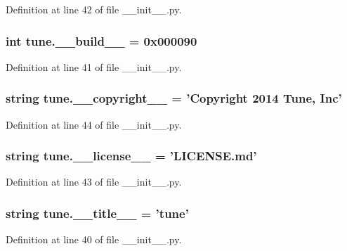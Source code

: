 Definition at line 42 of file \-\_\-\-\_\-init\-\_\-\-\_\-.\-py.

\hypertarget{namespacetune_a6d8e129c5551d67c880bfa5e4deb52ab}{
\subsubsection[{\-\_\-\-\_\-build\-\_\-\-\_\-}]{\setlength{\rightskip}{0pt plus 5cm}int tune.\-\_\-\-\_\-build\-\_\-\-\_\- = 0x000090}}\label{namespacetune_a6d8e129c5551d67c880bfa5e4deb52ab}


Definition at line 41 of file \-\_\-\-\_\-init\-\_\-\-\_\-.\-py.

\hypertarget{namespacetune_a647f6c750f7edd2a15a877ca860f1751}{
\subsubsection[{\-\_\-\-\_\-copyright\-\_\-\-\_\-}]{\setlength{\rightskip}{0pt plus 5cm}string tune.\-\_\-\-\_\-copyright\-\_\-\-\_\- = 'Copyright 2014 Tune, Inc'}}\label{namespacetune_a647f6c750f7edd2a15a877ca860f1751}


Definition at line 44 of file \-\_\-\-\_\-init\-\_\-\-\_\-.\-py.

\hypertarget{namespacetune_a17571a6e3a57f5df06f9a721b48b853f}{
\subsubsection[{\-\_\-\-\_\-license\-\_\-\-\_\-}]{\setlength{\rightskip}{0pt plus 5cm}string tune.\-\_\-\-\_\-license\-\_\-\-\_\- = 'L\-I\-C\-E\-N\-S\-E.\-md'}}\label{namespacetune_a17571a6e3a57f5df06f9a721b48b853f}


Definition at line 43 of file \-\_\-\-\_\-init\-\_\-\-\_\-.\-py.

\hypertarget{namespacetune_aebd95de7f1e0713438deabad8213f921}{
\subsubsection[{\-\_\-\-\_\-title\-\_\-\-\_\-}]{\setlength{\rightskip}{0pt plus 5cm}string tune.\-\_\-\-\_\-title\-\_\-\-\_\- = 'tune'}}\label{namespacetune_aebd95de7f1e0713438deabad8213f921}


Definition at line 40 of file \-\_\-\-\_\-init\-\_\-\-\_\-.\-py.

